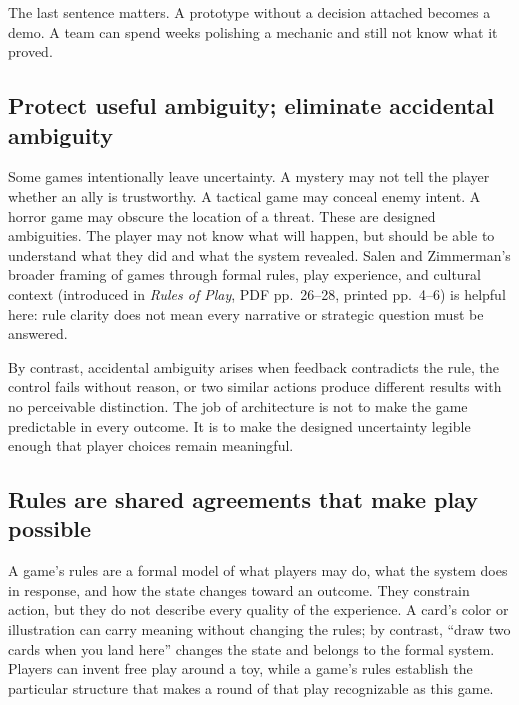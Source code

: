 The last sentence matters. A prototype without a decision attached becomes a demo. A team can spend weeks polishing a mechanic and still not know what it proved.

\subsection{Protect useful ambiguity; eliminate accidental ambiguity}\label{05-engine-i-ch009-protect-useful-ambiguity-eliminate-accidental-ambiguity}

\hypertarget{05-engine-i-ch009-protect-useful-ambiguity-eliminate-accidental-ambiguity}{}

Some games intentionally leave uncertainty. A mystery may not tell the player whether an ally is trustworthy. A tactical game may conceal enemy intent. A horror game may obscure the location of a threat. These are designed ambiguities. The player may not know what will happen, but should be able to understand what they did and what the system revealed. Salen and Zimmerman's broader framing of games through formal rules, play experience, and cultural context (introduced in \emph{Rules of Play}, PDF pp.~26--28, printed pp.~4--6) is helpful here: rule clarity does not mean every narrative or strategic question must be answered.

By contrast, accidental ambiguity arises when feedback contradicts the rule, the control fails without reason, or two similar actions produce different results with no perceivable distinction. The job of architecture is not to make the game predictable in every outcome. It is to make the designed uncertainty legible enough that player choices remain meaningful.

\subsection{Rules are shared agreements that make play possible}\label{05-engine-i-ch009-rules-are-shared-agreements-that-make-play-possible}

\hypertarget{05-engine-i-ch009-rules-are-shared-agreements-that-make-play-possible}{}

A game's rules are a formal model of what players may do, what the system does in response, and how the state changes toward an outcome. They constrain action, but they do not describe every quality of the experience. A card's color or illustration can carry meaning without changing the rules; by contrast, ``draw two cards when you land here'' changes the state and belongs to the formal system. Players can invent free play around a toy, while a game's rules establish the particular structure that makes a round of that play recognizable as this game.

